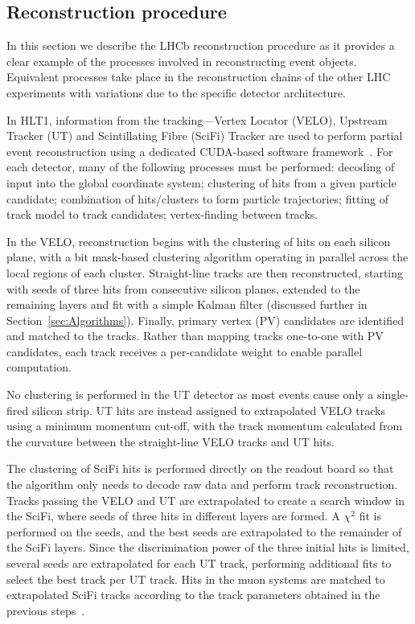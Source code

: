 \subsection{Reconstruction procedure}

In this section we describe the LHCb reconstruction procedure as it provides a clear example of the processes involved in reconstructing event objects. Equivalent processes take place in the reconstruction chains of the other LHC experiments with variations due to the specific detector architecture.

In HLT1, information from the tracking—Vertex Locator (VELO), Upstream Tracker (UT) and Scintillating Fibre (SciFi) Tracker are used to perform partial event reconstruction using a dedicated CUDA-based software framework~\cite{LHCb_Allen_GPU}. For each detector, many of the following processes must be performed: decoding of input into the global coordinate system; clustering of hits from a given particle candidate; combination of hits/clusters to form particle trajectories; fitting of track model to track candidates; vertex-finding between tracks.

In the VELO, reconstruction begins with the clustering of hits on each silicon plane, with a bit mask-based clustering algorithm operating in parallel across the local regions of each cluster. Straight-line tracks are then reconstructed, starting with seeds of three hits from consecutive silicon planes, extended to the remaining layers and fit with a simple Kalman filter (discussed further in Section~\ref{sec:Algorithms}). Finally, primary vertex (PV) candidates are identified and matched to the tracks. Rather than mapping tracks one-to-one with PV candidates, each track receives a per-candidate weight to enable parallel computation. 

No clustering is performed in the UT detector as most events cause only a single-fired silicon strip. UT hits are instead assigned to extrapolated VELO tracks using a minimum momentum cut-off, with the track momentum calculated from the curvature between the straight-line VELO tracks and UT hits.

The clustering of SciFi hits is performed directly on the readout board so that the algorithm only needs to decode raw data and perform track reconstruction. Tracks passing the VELO and UT are extrapolated to create a search window in the SciFi, where seeds of three hits in different layers are formed. A $\chi^2$ fit is performed on the seeds, and the best seeds are extrapolated to the remainder of the SciFi layers. Since the discrimination power of the three initial hits is limited, several seeds are extrapolated for each UT track, performing additional fits to select the best track per UT track. Hits in the muon systems are matched to extrapolated SciFi tracks according to the track parameters obtained in the previous steps~\cite{LHCb:2023hlw, LHCb_Allen_GPU}.